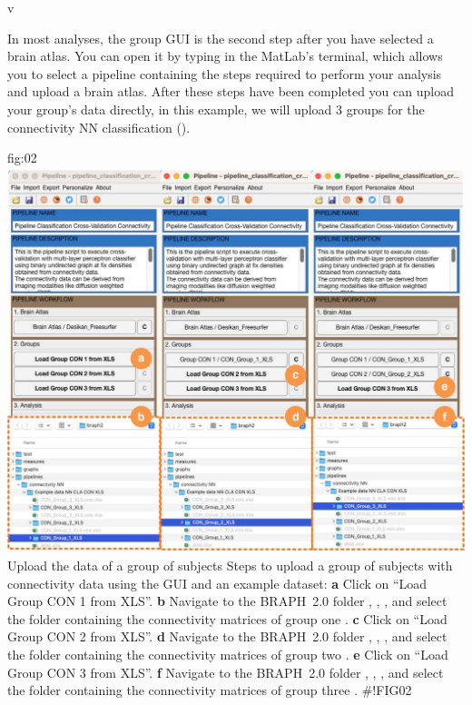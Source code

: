 v\documentclass[justified]{tufte-handout}
\begin{document}
In most analyses, the group GUI is the second step after you have selected a brain atlas. You can open it by typing  in the MatLab's terminal, which allows you to select a pipeline containing the steps required to perform your analysis and upload a brain atlas. After these steps have been completed you can upload your group's data directly, in this example, we will upload 3 groups for the connectivity NN classification (). 

	{fig:02}
	{
	\includegraphics{fig02.jpg}
	}
	{Upload the data of a group of subjects}
	{
	Steps to upload a group of subjects with connectivity data using the GUI and an example dataset: 
	{\bf a} Click on ``Load Group CON 1 from XLS''.
	{\bf b} Navigate to the BRAPH~2.0 folder , , , and select the folder containing the connectivity matrices of group one .
        {\bf c} Click on ``Load Group CON 2 from XLS''.
	{\bf d} Navigate to the BRAPH~2.0 folder , , , and select the folder containing the connectivity matrices of group two .
        {\bf e} Click on ``Load Group CON 3 from XLS''.
        {\bf f} Navigate to the BRAPH~2.0 folder , , , and select the folder containing the connectivity matrices of group three .
	}
#!FIG02
\end{document}
